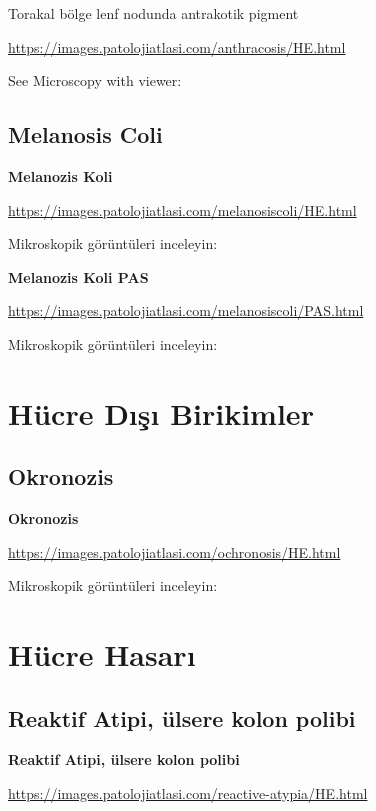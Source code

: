 \documentclass[
  letterpaper,
  DIV=11,
  numbers=noendperiod]{scrreprt}
\begin{document}
Torakal bölge lenf nodunda antrakotik pigment

\url{https://images.patolojiatlasi.com/anthracosis/HE.html}

See Microscopy with viewer:

\hypertarget{melanosis-coli}{%
\section{Melanosis Coli}\label{melanosis-coli}}

\textbf{Melanozis Koli}

\url{https://images.patolojiatlasi.com/melanosiscoli/HE.html}

Mikroskopik görüntüleri inceleyin:

\textbf{Melanozis Koli PAS}

\url{https://images.patolojiatlasi.com/melanosiscoli/PAS.html}

Mikroskopik görüntüleri inceleyin:

\hypertarget{huxfccre-dux131ux15fux131-birikimler}{%
\chapter{Hücre Dışı
Birikimler}\label{huxfccre-dux131ux15fux131-birikimler}}

\hypertarget{okronozis}{%
\section{Okronozis}\label{okronozis}}

\textbf{Okronozis}

\url{https://images.patolojiatlasi.com/ochronosis/HE.html}

Mikroskopik görüntüleri inceleyin:

\hypertarget{huxfccre-hasarux131}{%
\chapter{Hücre Hasarı}\label{huxfccre-hasarux131}}

\hypertarget{reaktif-atipi-uxfclsere-kolon-polibi}{%
\section{Reaktif Atipi, ülsere kolon
polibi}\label{reaktif-atipi-uxfclsere-kolon-polibi}}

\textbf{Reaktif Atipi, ülsere kolon polibi}

\url{https://images.patolojiatlasi.com/reactive-atypia/HE.html}
\end{document}
